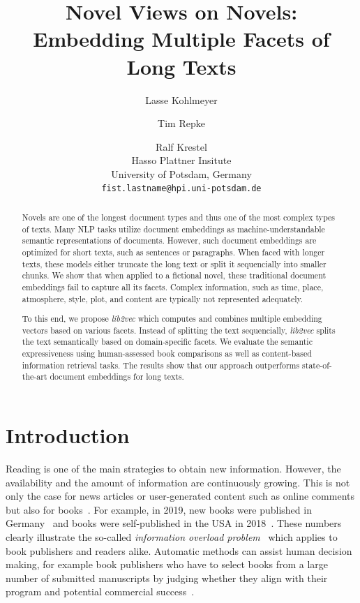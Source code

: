 \documentclass[11pt]{article}
\title{Novel Views on Novels:\\Embedding Multiple Facets of Long Texts}
\author{Lasse Kohlmeyer \and Tim Repke \and Ralf Krestel \\
  Hasso Plattner Insitute\\
  University of Potsdam, Germany \\
  \texttt{fist.lastname@hpi.uni-potsdam.de}
  \\}
\begin{document}
\maketitle

\begin{abstract}
Novels are one of the longest document types and thus one of the most complex types of texts.
Many NLP tasks utilize document embeddings as machine-understandable semantic representations of documents.
However, such document embeddings are optimized for short texts, such as sentences or paragraphs.
When faced with longer texts, these models either truncate the long text or split it sequencially into smaller chunks.
We show that when applied to a fictional novel, these traditional document embeddings fail to capture all its facets.
Complex information, such as time, place, atmosphere, style, plot, and content are typically not represented adequately.

To this end, we propose \emph{lib2vec} which computes and combines multiple embedding vectors based on various facets.
Instead of splitting the text sequencially, \emph{lib2vec} splits the text semantically based on domain-specific facets.
We evaluate the semantic expressiveness using human-assessed book comparisons as well as content-based information retrieval tasks.
The results show that our approach outperforms state-of-the-art document embeddings for long texts.
\end{abstract}

\section{Introduction}
Reading is one of the main strategies to obtain new information.
However, the availability and the amount of information are continuously growing.
This is not only the case for news articles or user-generated content such as online comments but also for books~\citep{wu_mind_2020, roser_books_2013, fink-jensen_book_2015}.
For example, in 2019,  new books were published in Germany~\citep{lippmann_buchproduktion_2019} and  books were self-published in the USA in 2018~\citep{bowker_self-publishing_2019}.
These numbers clearly illustrate the so-called \textit{information overload problem}~\citep{wang_literature_2020, alharthi_survey_2018} which applies to book publishers and readers alike.
Automatic methods can assist human decision making, for example book publishers who have to select books from a large number of submitted manuscripts by judging whether they align with their program and potential commercial success~\cite{ashok_2013}.
\end{document}
